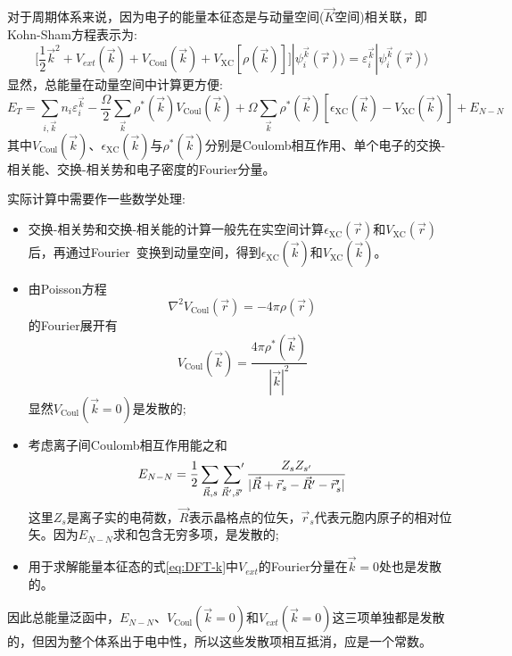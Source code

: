 对于周期体系来说，因为电子的能量本征态是与动量空间($\vec K$空间)相关联，即\textrm{Kohn-Sham}方程表示为:
\begin{equation}
	\bigg[\dfrac12\vec k^2+V_{ext}(\vec k)+V_{\mathrm{Coul}}(\vec k)+V_{\mathrm{XC}}[\rho(\vec k)]\bigg]|\psi_i^{\vec k}(\vec r)\rangle=\varepsilon_i^{\vec k}|\psi_i^{\vec k}(\vec r)\rangle
	\label{eq:DFT-k}
\end{equation}
显然，总能量在动量空间中计算更方便:~
\begin{equation}
	E_T=\sum_{i,\vec k}n_i\varepsilon_i^{\vec k}-\dfrac{\Omega}2\sum_{\vec k}\rho^{\ast}(\vec k)V_{\mathrm{Coul}}(\vec k)+\Omega\sum_{\vec k}\rho^{\ast}(\vec k)[\epsilon_{\mathrm{XC}}(\vec k)-V_{\mathrm{XC}}(\vec k)]+E_{N-N}
	\label{eq:DFT_ENE_G}
\end{equation}
其中$V_{\mathrm{Coul}}(\vec k)$、$\epsilon_{\mathrm{XC}}(\vec k)$与$\rho^{\ast}(\vec k)$分别是\textrm{Coulomb}相互作用、单个电子的交换-相关能、交换-相关势和电子密度的\textrm{Fourier}分量。

实际计算中需要作一些数学处理:~
\begin{itemize}
	\item 交换-相关势和交换-相关能的计算一般先在实空间计算$\epsilon_{\mathrm{XC}}(\vec r)$和$V_{\mathrm{XC}}(\vec r)$后，再通过\textrm{Fourier~}变换到动量空间，得到$\epsilon_{\mathrm{XC}}(\vec k)$和$V_{\mathrm{XC}}(\vec k)$。
	\item 由\textrm{Poisson}方程
\begin{equation}
	\nabla^2V_{\mathrm{Coul}}(\vec r)=-4\pi\rho(\vec r)
	\label{eq:Poisson}
\end{equation}
的\textrm{Fourier}展开有
\begin{equation}
	V_{\mathrm{Coul}}(\vec k)=\dfrac{4\pi\rho^{\ast}(\vec k)}{|\vec k|^2}
	\label{eq:FFT_Poisson}
\end{equation}
显然$V_{\mathrm{Coul}}(\vec k=0)$是发散的;
	\item 考虑离子间\textrm{Coulomb}相互作用能之和
	\begin{equation}
		E_{N-N}=\dfrac12\sum_{\vec R,s}\sideset{}{^{\prime}}\sum_{\vec R^{\prime},\vec s^{\prime}}\dfrac{Z_sZ_{s^{\prime}}}{|\vec R+\vec r_s-\vec R^{\prime}-\vec r_s^{\prime}|}
		\label{eq:Ion_Coulomb_ENE}
	\end{equation}
这里$Z_s$是离子实的电荷数，$\vec R$表示晶格点的位矢，$\vec r_s$代表元胞内原子的相对位矢。因为$E_{N-N}$求和包含无穷多项，是发散的;
	\item 用于求解能量本征态的式\eqref{eq:DFT-k}中$V_{ext}$的\textrm{Fourier}分量在$\vec k=0$处也是发散的。
\end{itemize}
因此总能量泛函中，$E_{N-N}$、$V_{\mathrm{Coul}}(\vec k=0)$和$V_{ext}(\vec k=0)$这三项单独都是发散的，但因为整个体系出于电中性，所以这些发散项相互抵消，应是一个常数。

